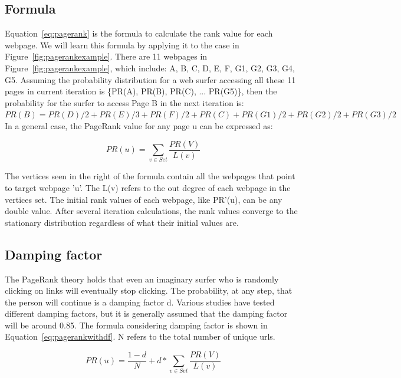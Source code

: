 \subsection{Formula}

Equation~\ref{eq:pagerank} is the formula to calculate the rank value for each
webpage. We will learn this formula by applying it to the case in
Figure~\ref{fig:pagerankexample}. There are 11 webpages in
Figure~\ref{fig:pagerankexample}, which include: {A, B, C, D, E, F, G1, G2, G3,
G4, G5}. Assuming the probability distribution for a web surfer accessing all
these 11 pages in current iteration is \{PR(A), PR(B), PR(C), ... PR(G5)\},
then the probability for the surfer to access Page B in the next iteration is:
\\

$PR(B) = PR(D)/2 + PR(E)/3 + PR(F)/2 + PR(C) + PR(G1)/2 + PR(G2)/2 + PR(G3)/2 $\\


In a general case, the PageRank value for any page u can be expressed as:

\begin{equation}\label{eq:pagerank}
PR(u) = \sum_{v \in Set} \frac{PR(V)}{L(v)}
\end{equation}

The vertices seen in the right of the formula contain all the webpages that
point to target webpage 'u'. The L(v) refers to the out degree of each webpage
in the vertices set. The initial rank values of each webpage, like PR'(u), can
be any double value. After several iteration calculations, the rank values
converge to the stationary distribution regardless of what their initial values
are.

\subsection{Damping factor}
The PageRank theory holds that even an imaginary surfer who is randomly
clicking on links will eventually stop clicking. The probability, at any step,
that the person will continue is a damping factor d. Various studies have
tested different damping factors, but it is generally assumed that the damping
factor will be around 0.85. The formula considering damping factor is shown in
Equation~\ref{eq:pagerankwithdf}. N refers to the total number of unique urls. 

\begin{equation}\label{eq:pagerankwithdf}
PR(u) = \frac{1-d}{N} + d * \sum_{v \in Set} \frac{PR(V)}{L(v)}
\end{equation}

